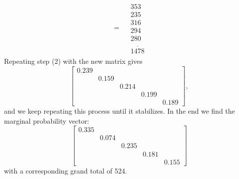 \begin{example}
\begin{equation}
\begin{array}{*{20}{c}}
{\begin{array}{*{20}{c}}
 = 
\end{array}}
\end{array}\begin{array}{*{20}{c}}
{\begin{array}{*{20}{c}}
{353}\\
{235}\\
{316}\\
{294}\\
{280}
\end{array}}\\
{\overline {\begin{array}{*{20}{c}}
{1478}
\end{array}} }
\end{array}
\end{equation}
Repeating step (2) with the new matrix gives
\begin{equation}
\left [ \begin{array}{ccccc}
0.239 & & & & \\
& 0.159 & & &\\
& & 0.214 & & \\
& & & 0.199 & \\
& & & & 0.189
\end{array}
\right ] ,
\end{equation}
and we keep repeating this process until it stabilizes.  In the end we find the marginal probability 
vector:
\begin{equation}
\left [ \begin{array}{ccccc}
0.335 \\
& 0.074 \\
& & 0.235 \\
& & & 0.181\\
& & & & 0.155
\end{array}
\right ]
\end{equation}
with a corresponding grand total of 524.


\end{example}
